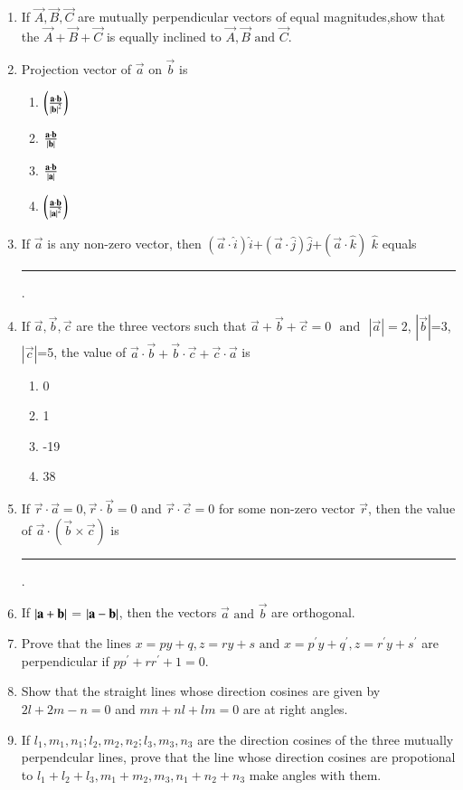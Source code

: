 \begin{enumerate}[label=\thesubsection.\arabic*,ref=\thesubsection.\theenumi]
    \item If $ \vec{A},\vec{B},\vec{C} $ are mutually perpendicular vectors of equal magnitudes,show that the  $ \vec{A}+\vec{B}+\vec{C} $ is equally inclined to $ \vec{A},\vec{B}  \text{ and }  \vec{C} $.
\item Projection vector of $\vec{a}$ on $\vec{b}$ is
	\begin{enumerate}
\item $\left(\frac{\mathbf{a}\cdot\mathbf{b}}{\left\vert\mathbf{b}\right\vert^2}\right)$
\item $\frac{\mathbf{a}\cdot\mathbf{b}}{\left\vert\mathbf{b}\right\vert}$
\item $\frac{\mathbf{a}\cdot\mathbf{b}}{\left\vert\mathbf{a}\right\vert}$
\item $\left(\frac{\mathbf{a}\cdot\mathbf{b}}{\left\vert\mathbf{a}\right\vert^2}\right)$
\end{enumerate}
\item If $\vec{a}$ is  any non-zero vector, then $(\vec{a}\cdot \hat{i})\hat{i}$+$(\vec{a}\cdot \hat{j})\hat{j}$+$(\vec{a}\cdot \hat{k})$ $\hat{k}$ equals \rule{1cm}{0.15mm}.
\item If $\vec{a},\vec{b},\vec{c}$ are the three vectors such that $\vec{a}+\vec{b}+\vec{c}=0$ $\text{ and }$ $|\vec{a}|=2$, $|\vec{b}|$=3, $|\vec{c}|$=5, the value of $\vec{a} \cdot \vec{b}+\vec{b} \cdot \vec{c}+\vec{c} \cdot \vec{a}$ is
	\begin{enumerate}
\item 0
\item 1	
\item -19
\item 38
\end{enumerate}
\item If $\vec{r}\cdot\vec{a}=0, \vec{r}\cdot\vec{b}=0$ and $\vec{r}\cdot\vec{c}=0$ for some non-zero vector $\vec{r}$, then the value of $\vec{a}\cdot(\vec{b}\times\vec{c})$ is \rule{1cm}{0.15mm}.
\item If $\left\vert\mathbf{a}+\mathbf{b}\right\vert$ = $\left\vert\mathbf{a}-\mathbf{b}\right\vert$, then the vectors $\vec{a}$ $\text {and}$ $\vec{b}$ are orthogonal.
\item Prove that the lines $x=py+q , z=ry+s \text{ and } x=p^{\prime}y+q^{\prime}, z=r^{\prime}y+s^{\prime} $ are perpendicular if $pp^{\prime}+rr^{\prime}+1=0$.
\item Show that the straight lines whose direction cosines are given by $2l+2m-n=0$ and $mn+nl+lm=0$ are at right angles.
\item If $l_1, m_1, n_1;l_2, m_2, n_2;l_3, m_3, n_3$ are the direction cosines of the three mutually perpendcular lines, prove that the line whose direction cosines are propotional to $l_1+l_2+l_3 , m_1+m_2,m_3, n_1+n_2+n_3$ make angles with them.
\end{enumerate}
